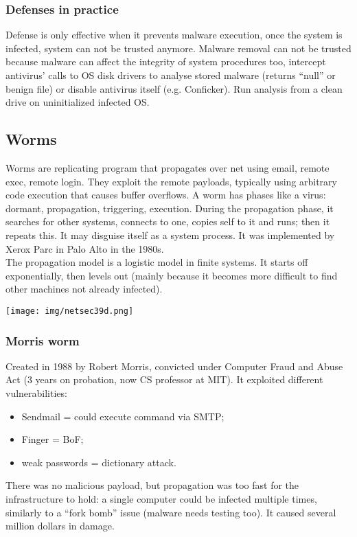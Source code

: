 \documentclass[a4paper, 10pt, titlepage]{article}
\begin{document}
\subsubsection*{Defenses in practice}
 Defense is only effective when it prevents malware execution, once the system is infected, system can not be trusted anymore. Malware removal can not be trusted because malware can affect the integrity of system procedures too, intercept antivirus’ calls to OS disk drivers to analyse stored malware (returns “null” or benign file) or disable antivirus itself (e.g. Conficker).
 Run analysis from a clean drive on uninitialized infected OS.
 
 
 \subsection{Worms}
Worms are replicating program that propagates over net using email, remote exec, remote login. They exploit the remote payloads, typically using arbitrary code execution that causes buffer overflows.
A worm has phases like a virus: dormant, propagation, triggering, execution. During the propagation phase, it searches for other systems, connects to one, copies self to it and runs; then it repeats this. It may disguise itself as a system process. It was implemented by Xerox Parc in Palo Alto in the 1980s.\medskip\\
The propagation model is a logistic model in finite systems. It starts off exponentially, then levels out (mainly because it becomes more difficult to find other machines not already infected).
\begin{center}
	\texttt{[image: img/netsec39d.png]}
\end{center}

\subsubsection{Morris worm}
Created in 1988 by Robert Morris, convicted under Computer Fraud and Abuse Act (3 years on probation, now CS professor at MIT). 
It exploited different vulnerabilities:
\begin{itemize}
	\item Sendmail = could execute command via SMTP;
	\item Finger = BoF;
	\item weak passwords = dictionary attack.
\end{itemize}
There was no malicious payload, but propagation was too fast for the infrastructure to hold: a single computer could be infected multiple times, similarly to a “fork bomb” issue (malware needs testing too). It caused several million dollars in damage.
\end{document}

